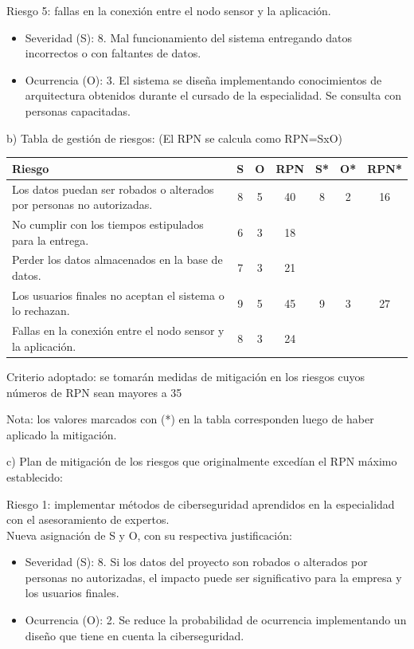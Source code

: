 \documentclass[
11pt, %
]{charter}
\begin{document}
Riesgo 5: fallas en la conexión entre el nodo sensor y la aplicación.
\begin{itemize}
	\item Severidad (S): 8. Mal funcionamiento del sistema entregando datos incorrectos o con faltantes de datos. 
	\item Ocurrencia (O): 3. El sistema se diseña implementando conocimientos de arquitectura obtenidos durante el cursado de la especialidad. Se consulta con personas capacitadas. 
\end{itemize}

b) Tabla de gestión de riesgos:      (El RPN se calcula como RPN=SxO)

\begin{table}[htpb]


\centering
\begin{tabularx}{\linewidth}{@{}|X|c|c|c|c|c|c|@{}}
\hline
\rowcolor[HTML]{C0C0C0} 
Riesgo & S & O & RPN & S* & O* & RPN* \\ \hline
Los datos puedan ser robados o alterados por personas no autorizadas.      & 8 & 5 & \cellcolor[HTML]{FF0000}40  & 8  & 2  & \cellcolor[HTML]{3EFF3F}16   \\ \hline
No cumplir con los tiempos estipulados para la entrega.      & 6 & 3 & \cellcolor[HTML]{3EFF3F}18  &    &    &      \\ \hline
Perder los datos almacenados en la base de datos.      & 7 & 3 & \cellcolor[HTML]{3EFF3F}21  &    &    &      \\ \hline
Los usuarios finales no aceptan el sistema o lo rechazan.      & 9 & 5 & \cellcolor[HTML]{FF0000}45  & 9  & 3  & \cellcolor[HTML]{3EFF3F}27   \\ \hline
Fallas en la conexión entre el nodo sensor y la aplicación.      & 8 & 3 & \cellcolor[HTML]{3EFF3F}24  &    &    &      \\ \hline
\end{tabularx}%
\end{table}

Criterio adoptado: 
se tomarán medidas de mitigación en los riesgos cuyos números de RPN sean mayores a 35

Nota: los valores marcados con (*) en la tabla corresponden luego de haber aplicado la mitigación.

c) Plan de mitigación de los riesgos que originalmente excedían el RPN máximo establecido:
 
Riesgo 1: implementar métodos de ciberseguridad aprendidos en la especialidad con el asesoramiento de expertos.\\
Nueva asignación de S y O, con su respectiva justificación:
\begin{itemize}
  \item Severidad (S): 8. Si los datos del proyecto son robados o alterados por personas no autorizadas, el impacto puede ser significativo para la empresa y los usuarios finales.
  \item Ocurrencia (O): 2. Se reduce la probabilidad de ocurrencia implementando un diseño que tiene en cuenta la ciberseguridad. 
\end{itemize}
\end{document}
